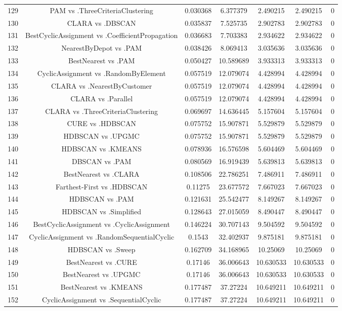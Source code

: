 \documentclass[a4paper,10pt]{article}
\begin{document}
\begin{landscape}
\begin{table}[!htp]
\begin{tabular}{ccccccc}
129&PAM vs .ThreeCriteriaClustering&0.030368&6.377379&2.490215&2.490215&0\\
130&CLARA vs .DBSCAN&0.035837&7.525735&2.902783&2.902783&0\\
131&BestCyclicAssignment vs .CoefficientPropagation&0.036683&7.703383&2.934622&2.934622&0\\
132&NearestByDepot vs .PAM&0.038426&8.069413&3.035636&3.035636&0\\
133&BestNearest vs .PAM&0.050427&10.589689&3.933313&3.933313&0\\
134&CyclicAssignment vs .RandomByElement&0.057519&12.079074&4.428994&4.428994&0\\
135&CLARA vs .NearestByCustomer&0.057519&12.079074&4.428994&4.428994&0\\
136&CLARA vs .Parallel&0.057519&12.079074&4.428994&4.428994&0\\
137&CLARA vs .ThreeCriteriaClustering&0.069697&14.636445&5.157604&5.157604&0\\
138&CURE vs .HDBSCAN&0.075752&15.907871&5.529879&5.529879&0\\
139&HDBSCAN vs .UPGMC&0.075752&15.907871&5.529879&5.529879&0\\
140&HDBSCAN vs .KMEANS&0.078936&16.576598&5.604469&5.604469&0\\
141&DBSCAN vs .PAM&0.080569&16.919439&5.639813&5.639813&0\\
142&BestNearest vs .CLARA&0.108506&22.786251&7.486911&7.486911&0\\
143&Farthest-First vs .HDBSCAN&0.11275&23.677572&7.667023&7.667023&0\\
144&HDBSCAN vs .PAM&0.121631&25.542477&8.149267&8.149267&0\\
145&HDBSCAN vs .Simplified&0.128643&27.015059&8.490447&8.490447&0\\
146&BestCyclicAssignment vs .CyclicAssignment&0.146224&30.707143&9.504592&9.504592&0\\
147&CyclicAssignment vs .RandomSequentialCyclic&0.1543&32.402937&9.875181&9.875181&0\\
148&HDBSCAN vs .Sweep&0.162709&34.168965&10.25069&10.25069&0\\
149&BestNearest vs .CURE&0.17146&36.006643&10.630533&10.630533&0\\
150&BestNearest vs .UPGMC&0.17146&36.006643&10.630533&10.630533&0\\
151&BestNearest vs .KMEANS&0.177487&37.27224&10.649211&10.649211&0\\
152&CyclicAssignment vs .SequentialCyclic&0.177487&37.27224&10.649211&10.649211&0\\

\end{tabular}
\end{table}
\end{landscape}
\end{document}
